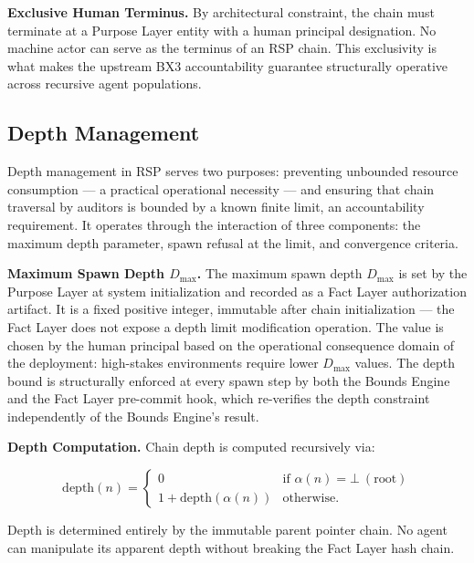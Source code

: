 \documentclass[12pt]{article}
\begin{document}
\bigskip
\noindent\textbf{Exclusive Human Terminus.} By architectural constraint, the chain must terminate at a Purpose Layer entity with a human principal designation. No machine actor can serve as the terminus of an RSP chain. This exclusivity is what makes the upstream BX3 accountability guarantee structurally operative across recursive agent populations.

\subsection{Depth Management}

Depth management in RSP serves two purposes: preventing unbounded resource consumption — a practical operational necessity — and ensuring that chain traversal by auditors is bounded by a known finite limit, an accountability requirement. It operates through the interaction of three components: the maximum depth parameter, spawn refusal at the limit, and convergence criteria.

\bigskip
\noindent\textbf{Maximum Spawn Depth $D_{\max}$.} The maximum spawn depth $D_{\max}$ is set by the Purpose Layer at system initialization and recorded as a Fact Layer authorization artifact. It is a fixed positive integer, immutable after chain initialization — the Fact Layer does not expose a depth limit modification operation. The value is chosen by the human principal based on the operational consequence domain of the deployment: high-stakes environments require lower $D_{\max}$ values. The depth bound is structurally enforced at every spawn step by both the Bounds Engine and the Fact Layer pre-commit hook, which re-verifies the depth constraint independently of the Bounds Engine's result.

\bigskip
\noindent\textbf{Depth Computation.} Chain depth is computed recursively via:

\begin{equation}
\mathrm{depth}(n) =
\begin{cases}
0 & \text{if }\alpha(n) = \bot\ (\text{root}) \\[6pt]
1 + \mathrm{depth}(\alpha(n)) & \text{otherwise}.
\end{cases}
\label{eq:rs-depth-computation}
\end{equation}

Depth is determined entirely by the immutable parent pointer chain. No agent can manipulate its apparent depth without breaking the Fact Layer hash chain.
\end{document}
